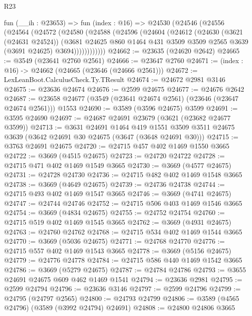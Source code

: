 \begin{lexlean}{R23}
\begin{coremodule}
    fun (__ih : @23653) =>
    fun (index : @16) =>
    @24530
      (@24546
        (@24556
          (@24564
            (@24572
              (@24580
                (@24588
                  (@24596
                    (@24604
                      (@24612
                        (@24630
                          (@3621 (@24631 @24524))
                          (@3681
                            @24625
                            @860
                            @1464
                            @431
                            @3509
                            @3509
                            @2565
                            @3639
                            (@3691 @24625)
                            @3694))))))))))))
@24662 := @23635 (@24620 @2642)
@24665 := @3549 (@23641 @2760 @2561)
@24666 := @23647 @2760
@24671 := (index : @16) -> @24662 (@24665 (@23646 (@24666 @2561)))
@24672 := LexLeanBoot.CalculusCheck.Ty.TResult
@24674 := @24672 @2981 @3146
@24675 := @23636 @24674
@24676 := @2599 @24675
@24677 := @24676 @2642
@24687 := @23658 @24677 (@3549 (@23641 @24674 @2561) (@23646 (@23647 @24674 @2561))) @1553
@24690 := @3589 (@3596 @24675) @3599
@24691 := @3595 @24690
@24697 := @24687 @24691 @23679 (@3621 (@23682 @24677 @3599))
@24713 := @3631
    @24691
    @1464
    @419
    @1551
    @3509
    @3511
    @24675
    @3639
    (@3642 @24691 @30 @24675 (@3647 (@3648 @24691 @30)))
@24715 := @3763 @24691 @24675
@24720 := @24715 @457 @402 @1469 @1550 @3665
@24722 := @3669 (@4515 @24675)
@24723 := @24720 @24722
@24728 := @24715 @471 @402 @1469 @1549 @3665
@24730 := @3669 (@4577 @24675)
@24731 := @24728 @24730
@24736 := @24715 @482 @402 @1469 @1548 @3665
@24738 := @3669 (@4649 @24675)
@24739 := @24736 @24738
@24744 := @24715 @493 @402 @1469 @1547 @3665
@24746 := @3669 (@4741 @24675)
@24747 := @24744 @24746
@24752 := @24715 @506 @403 @1469 @1546 @3665
@24754 := @3669 (@4834 @24675)
@24755 := @24752 @24754
@24760 := @24715 @519 @402 @1469 @1545 @3665
@24762 := @3669 (@4931 @24675)
@24763 := @24760 @24762
@24768 := @24715 @534 @402 @1469 @1544 @3665
@24770 := @3669 (@5036 @24675)
@24771 := @24768 @24770
@24776 := @24715 @557 @402 @1469 @1543 @3665
@24778 := @3669 (@5156 @24675)
@24779 := @24776 @24778
@24784 := @24715 @586 @440 @1469 @1542 @3665
@24786 := @3669 (@5279 @24675)
@24787 := @24784 @24786
@24793 := @3655 @24691 @24675 @609 @462 @1469 @1541
@24794 := @23636 @2981
@24795 := @2599 @24794
@24796 := @23636 @3146
@24797 := @2599 @24796
@24799 := @24795 (@24797 @2565)
@24800 := @24793 @24799
@24806 := @3589 (@4565 @24796) (@3589 (@3992 @24794) @24691)
@24808 := @24800 @24806 @3665

\end{coremodule}
\end{lexlean}
